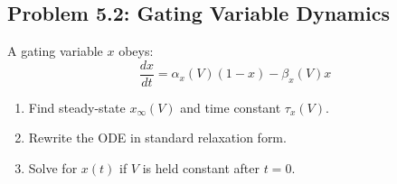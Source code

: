 \documentclass[10pt]{article}
\begin{document}
\subsection{Problem 5.2: Gating Variable Dynamics}

\begin{problem}
A gating variable $x$ obeys:
\[
\frac{dx}{dt} = \alpha_x(V)(1-x) - \beta_x(V) x
\]
\begin{enumerate}[label=(\alph*)]
\item Find steady-state $x_\infty(V)$ and time constant $\tau_x(V)$.
\item Rewrite the ODE in standard relaxation form.
\item Solve for $x(t)$ if $V$ is held constant after $t=0$.
\end{enumerate}
\end{problem}
\end{document}

